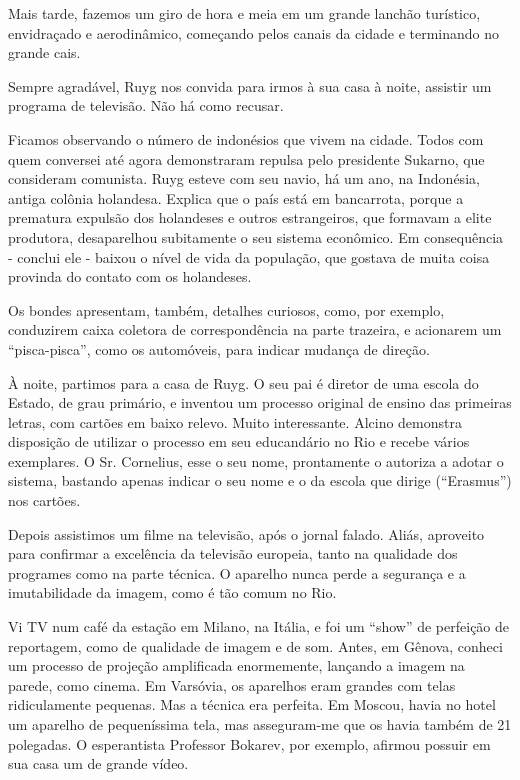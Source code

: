 Mais tarde, fazemos um giro de hora e meia em um grande lanchão turístico, envidraçado e aerodinâmico, começando pelos canais da cidade e terminando no grande cais.

Sempre agradável, Ruyg nos convida para irmos à sua casa à noite, assistir um programa de televisão. Não há como recusar.

Ficamos observando o número de indonésios que vivem na cidade. Todos com quem conversei até agora demonstraram repulsa pelo presidente Sukarno, que consideram comunista. Ruyg esteve com seu navio, há um ano, na Indonésia, antiga colônia holandesa. Explica que o país está em bancarrota, porque a prematura expulsão dos holandeses e outros estrangeiros, que formavam a elite produtora, desaparelhou subitamente o seu sistema econômico. Em consequência - conclui ele - baixou o nível de vida da população, que gostava de muita coisa provinda do contato com os holandeses.

Os bondes apresentam, também, detalhes curiosos, como, por exemplo, conduzirem caixa coletora de correspondência na parte trazeira, e acionarem um “pisca-pisca”, como os automóveis, para indicar mudança de direção.

À noite, partimos para a casa de Ruyg. O seu pai é diretor de uma escola do Estado, de grau primário, e inventou um processo original de ensino das primeiras letras, com cartões em baixo relevo. Muito interessante. Alcino demonstra disposição de utilizar o processo em seu educandário no Rio e recebe vários exemplares. O Sr. Cornelius, esse o seu nome, prontamente o autoriza a adotar o sistema, bastando apenas indicar o seu nome e o da escola que dirige (“Erasmus”) nos cartões.

Depois assistimos um filme na televisão, após o jornal falado. Aliás, aproveito para confirmar a excelência da televisão europeia, tanto na qualidade dos programes como na parte técnica. O aparelho nunca perde a segurança e a imutabilidade da imagem, como é tão comum no Rio.

Vi TV num café da estação em Milano, na Itália, e foi um “show” de perfeição de reportagem, como de qualidade de imagem e de som. Antes, em Gênova, conheci um processo de projeção amplificada enormemente, lançando a imagem na parede, como cinema. Em Varsóvia, os aparelhos eram grandes com telas ridiculamente pequenas. Mas a técnica era perfeita. Em Moscou, havia no hotel um aparelho de pequeníssima tela, mas asseguram-me que os havia também de 21 polegadas. O esperantista Professor Bokarev, por exemplo, afirmou possuir em sua casa um de grande vídeo.

